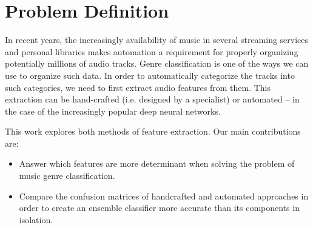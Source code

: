 \section{Problem Definition}

In recent years, the increasingly availability of music in several streaming services and personal libraries makes automation a requirement for properly organizing potentially millions of audio tracks. Genre classification is one of the ways we can use to organize such data. In order to automatically categorize the tracks into such categories, we need to first extract audio features from them. This extraction can be hand-crafted (i.e. designed by a specialist) or automated -- in the case of the increasingly popular deep neural networks.



This work explores both methods of feature extraction. Our main contributions are:

\begin{itemize}
    \item Answer which features are more determinant when solving the problem of music genre classification.
    \item Compare the confusion matrices of handcrafted and automated approaches in order to create an ensemble classifier more accurate than its components in isolation.
\end{itemize}

